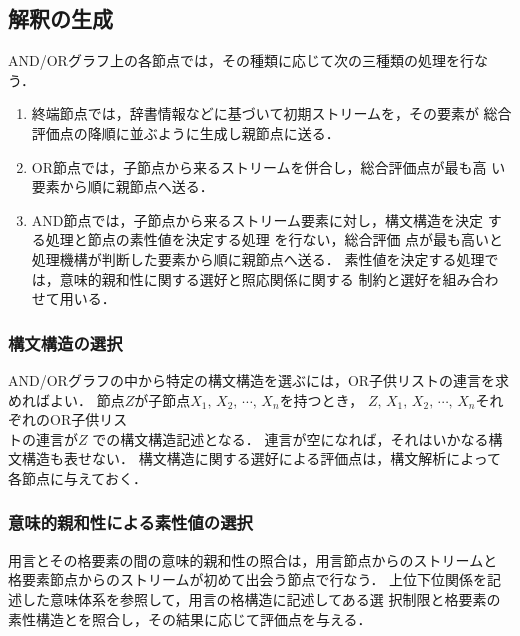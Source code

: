 \subsection{解釈の生成}
\label{sec:lazy:gen}

AND/ORグラフ上の各節点では，その種類に応じて次の三種類の処理を行なう．
\begin{enumerate}
\item 終端節点では，辞書情報などに基づいて初期ストリームを，その要素が
総合評価点の降順に並ぶように生成し親節点に送る． 
\item OR節点では，子節点から来るストリームを併合し，総合評価点が最も高
い要素から順に親節点へ送る．
\item AND節点では，子節点から来るストリーム要素に対し，構文構造を決定
する処理と節点の素性値を決定する処理
を行ない，総合評価
点が最も高いと処理機構が判断した要素から順に親節点へ送る．
素性値を決定する処理では，意味的親和性に関する選好と照応関係に関する
制約と選好を組み合わせて用いる．
\end{enumerate}

\subsubsection{構文構造の選択}
\label{sec:lazy:gen:syn}

AND/ORグラフの中から特定の構文構造を選ぶには，OR子供リストの連言を求
めればよい． \hspace*{-0.5mm}節点$Z$\hspace*{-0.1mm}が子節点$X_1,\,X_2,\,\cdots,\,X_n$\hspace*{-0.1mm}を持つとき，
\hspace*{-0.3mm}$Z,\,X_1,\,X_2,\,\cdots,\,X_n$\hspace*{-0.1mm}それぞれのOR子供リス\\トの連言が$Z$
での構文構造記述となる．
連言が空になれば，それはいかなる構文構造も表せない．
構文構造に関する選好による評価点は，構文解析によって各節点に与えておく．

\subsubsection{意味的親和性による素性値の選択}
\label{sec:lazy:gen:sem}

用言とその格要素の間の意味的親和性の照合は，用言節点からのストリームと
格要素節点からのストリームが初めて出会う節点で行なう．
上位下位関係を記述した意味体系を参照して，用言の格構造に記述してある選
択制限と格要素の素性構造とを照合し，その結果に応じて評価点を与える．

